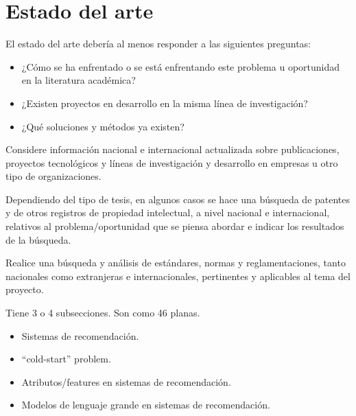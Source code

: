 
\chapter{Estado del arte} %
\label{sec:Estado Arte} %

El estado del arte debería al menos responder a las siguientes preguntas:
\begin{itemize}
	\item ¿Cómo se ha enfrentado o se está enfrentando este problema u oportunidad en la literatura académica? 
	\item ¿Existen proyectos en desarrollo en la misma línea de investigación? 
	\item ¿Qué soluciones y métodos ya existen? 
\end{itemize}

Considere información nacional e internacional actualizada sobre publicaciones, proyectos tecnológicos y líneas de investigación y desarrollo en empresas u otro tipo de organizaciones. 

Dependiendo del tipo de tesis, en algunos casos se hace una búsqueda de patentes y de otros registros de propiedad intelectual, a nivel nacional e internacional, relativos al problema/oportunidad que se piensa abordar e indicar los resultados de la búsqueda. 

Realice una búsqueda y análisis de estándares, normas y reglamentaciones, tanto nacionales como extranjeras e internacionales, pertinentes y aplicables al tema del proyecto. 

Tiene 3 o 4 subsecciones. Son como 4\/6 planas. 
\begin{itemize}
	\item Sistemas de recomendación.
	\item \enquote{cold-start} problem.
	\item Atributos/features en sistemas de recomendación.
	\item Modelos de lenguaje grande en sistemas de recomendación.
\end{itemize}